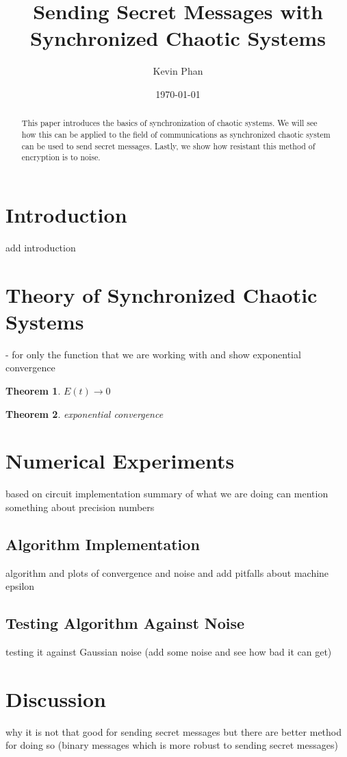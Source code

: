 \documentclass[12pt]{article}
\title{Sending Secret Messages with Synchronized Chaotic Systems}
\author{Kevin Phan}
\date{\today}
\newtheorem{theorem}{Theorem}
\begin{document}
    \maketitle

    \begin{abstract}
      This paper introduces the basics of synchronization of chaotic systems. We will see how this can be applied to the field of communications as synchronized chaotic system can be used to send secret messages. Lastly, we show how resistant this method of encryption is to noise. 
    \end{abstract}

    \newpage

    \tableofcontents

    \newpage

    \section{Introduction}
      add introduction \cite{cuomo1993}
    \section{Theory of Synchronized Chaotic Systems}
      - for only the function that we are working with and show exponential convergence 
      \begin{theorem}
        $E(t) \rightarrow 0$ 
      \end{theorem}
      \begin{theorem}
        exponential convergence 
      \end{theorem}
    \section{Numerical Experiments}
    based on circuit implementation \cite{cuomo1993}
    summary of what we are doing 
    can mention something about precision numbers 
    \subsection{Algorithm Implementation}
    algorithm and plots of convergence and noise and add pitfalls about machine epsilon 
    \subsection{Testing Algorithm Against Noise}
    testing it against Gaussian noise (add some noise and see how bad it can get)
    \section{Discussion}
    why it is not that good for sending secret messages but there are better method for doing so (binary messages which is more robust to sending secret messages)
  \newpage    
    \printbibliography
\end{document}
